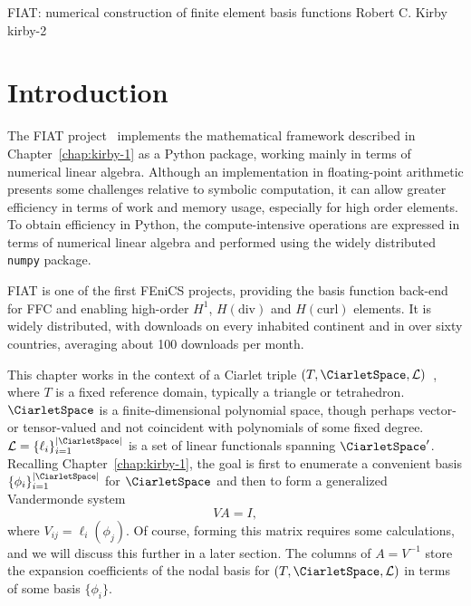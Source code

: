               {FIAT: numerical construction of finite element basis functions}
              {Robert C. Kirby}
              {kirby-2}

\section{Introduction}

The FIAT project~\citep{Kirby2004,Kirby2006} implements the mathematical
framework described in Chapter~\ref{chap:kirby-1} as a Python package,
working mainly in terms of numerical linear algebra.  Although an
implementation in floating-point arithmetic presents some challenges
relative to symbolic computation, it can allow greater efficiency in
terms of work and memory usage, especially for high order elements.
To obtain efficiency in Python, the compute-intensive operations are
expressed in terms of numerical linear algebra and performed using the
widely distributed \texttt{numpy} package.

FIAT is one of the first FEniCS projects, providing the basis function
back-end for FFC and enabling high-order \( H^1 \), \(
H(\mathrm{div}) \) and \( H(\mathrm{curl}) \) elements. It is widely
distributed, with downloads on every inhabited continent and in over
sixty countries, averaging about 100 downloads per month.

This chapter works in the context of a Ciarlet triple \( (T,\CiarletSpace,\mathcal{L})
\)~\citep{Ciarlet2002}, where \( T \) is a fixed reference domain,
typically a triangle or tetrahedron.  \( \CiarletSpace \) is a finite-dimensional
polynomial space, though perhaps vector- or tensor-valued and not
coincident with polynomials of some fixed degree.  \( \mathcal{L} =
\{ \ell_i \}_{i=1}^{|\CiarletSpace|} \) is a set of linear functionals spanning \(
\CiarletSpace^\prime \).  Recalling Chapter~\ref{chap:kirby-1}, the goal is first
to enumerate a convenient basis \( \{ \phi_i \}_{i=1}^{|\CiarletSpace|} \) for \(
\CiarletSpace \) and then to form a generalized Vandermonde system
\begin{equation}
  V A = I,
\end{equation}
where $V_{ij} = \ell_i( \phi_j)$.  Of course, forming this matrix
requires some calculations, and we will discuss this further in a later
section.  The columns of $A = V^{-1}$ store the expansion coefficients
of the nodal basis for \( (T,\CiarletSpace,\mathcal{L}) \) in terms of some basis
$\{ \phi_i \}$.

